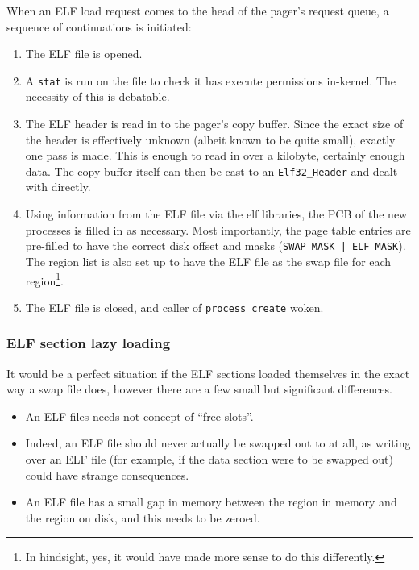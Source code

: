 \documentclass[12pt,english]{article}
\begin{document}
When an ELF load request comes to the head of the pager's request queue, a sequence of continuations is initiated:
\begin{enumerate}
\item The ELF file is opened.
\item A \texttt{stat} is run on the file to check it has execute permissions in-kernel.  The necessity of this is debatable.
\item The ELF header is read in to the pager's copy buffer.  Since the exact size of the header is effectively unknown (albeit known to be quite small), exactly one pass is made.  This is enough to read in over a kilobyte, certainly enough data.  The copy buffer itself can then be cast to an \texttt{Elf32\_Header} and dealt with directly.
\item Using information from the ELF file via the elf libraries, the PCB of the new processes is filled in as necessary.  Most importantly, the page table entries are pre-filled to have the correct disk offset and masks (\texttt{SWAP\_MASK | ELF\_MASK}).  The region list is also set up to have the ELF file as the swap file for each region\footnote{In hindsight, yes, it would have made more sense to do this differently.}.
\item The ELF file is closed, and caller of \texttt{process\_create} woken.
\end{enumerate}

\subsubsection{ELF section lazy loading}

It would be a perfect situation if the ELF sections loaded themselves in the exact way a swap file does, however there are a few small but significant differences.
\begin{itemize}
\item An ELF files needs not concept of ``free slots''.
\item Indeed, an ELF file should never actually be swapped out to at all, as writing over an ELF file (for example, if the data section were to be swapped out) could have strange consequences.
\item An ELF file has a small gap in memory between the region in memory and the region on disk, and this needs to be zeroed.
\end{itemize}
\end{document}
